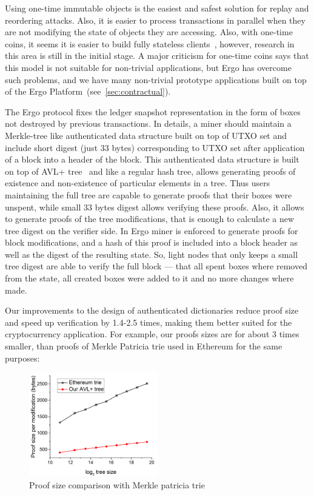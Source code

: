 Using one-time immutable objects is the easiest and safest solution for replay and reordering attacks.
Also, it is easier to process transactions in parallel when they are not modifying the state of objects they
are accessing.
Also, with one-time coins, it seems it is easier to build fully stateless clients~\cite{chepurnoy2018edrax},
however, research in this area is still in the initial stage.
A major criticism for one-time coins says that this model is not suitable for non-trivial applications,
but Ergo has overcome such problems, and we have many non-trivial prototype applications built on top of
the Ergo Platform~(see~\ref{sec:contractual}).

The Ergo protocol fixes the ledger snapshot representation in the form of boxes not destroyed by previous transactions.
In details, a miner should maintain a Merkle-tree like authenticated data structure built on top of UTXO set and include
short digest (just 33 bytes) corresponding to UTXO set after application of a block into a header of the block.
This authenticated data structure is built on top of AVL+ tree~\cite{reyzin2017improving} and like a regular hash tree,
allows generating proofs of existence and non-existence of particular elements in a tree.
Thus users maintaining the full tree are capable to generate proofs that their boxes were unspent, while small 33 bytes
digest allows verifying these proofs.
Also, it allows to generate proofs of the tree modifications, that is enough to calculate a new tree digest on the verifier side.
In Ergo miner is enforced to generate proofs for block modifications, and a hash of this proof is included into
a block header as well as the digest of the resulting state.
So, light nodes that only keeps a small tree digest are able to verify the full block --- that all spent boxes where
removed from the state, all created boxes were added to it and no more changes where made.

Our improvements to the design of authenticated dictionaries reduce proof size and speed
up verification by 1.4-2.5 times, making them better suited for the cryptocurrency application.
For example, our proofs sizes are for about 3 times smaller, than proofs of Merkle Patricia trie used in Ethereum
for the same purposes:


\begin{figure}[H]
    \centering
    \includegraphics[width=0.5\textwidth]{img/proofSize.png}
    \caption{Proof size comparison with Merkle patricia trie
    \label{fig:proofSize} }
\end{figure}

